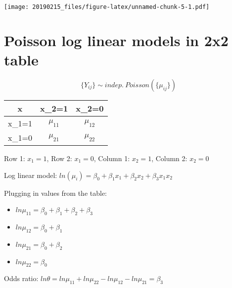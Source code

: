 \documentclass[]{article}
\providecommand{\tightlist}{%
  \setlength{\itemsep}{0pt}\setlength{\parskip}{0pt}}
\begin{document}
\texttt{[image: 20190215\_files/figure-latex/unnamed-chunk-5-1.pdf]}

\hypertarget{poisson-log-linear-models-in-2x2-table}{%
\section{Poisson log linear models in 2x2
table}\label{poisson-log-linear-models-in-2x2-table}}

\[\{Y_{ij}\} \sim indep.\ Poisson(\{\mu_{ij}\})\]

\begin{center}
 \begin{tabular}{|c | c | c |}
 \hline
 x&x_2=1&x_2=0\\ [0.5 ex]
 \hline
 x_1=1&$\mu_{11}$&$\mu_{12}$\\
 \hline
 x_1=0&$\mu_{21}$&$\mu_{22}$\\
 \hline
\end{tabular}
\end{center}

Row 1: \(x_1=1\), Row 2: \(x_1=0\), Column 1: \(x_2=1\), Column 2:
\(x_2=0\)

Log linear model:
\(ln(\mu_i) = \beta_0 + \beta_1 x_1 + \beta_2 x_2 + \beta_3 x_1x_2\)

Plugging in values from the table:

\begin{itemize}
\tightlist
\item
  \(ln\mu_{11} = \beta_0 + \beta_1 + \beta_2 + \beta_3\)
\item
  \(ln\mu_{12} = \beta_0 + \beta_1\)
\item
  \(ln\mu_{21} = \beta_0 + \beta_2\)
\item
  \(ln\mu_{22} = \beta_0\)
\end{itemize}

Odds ratio:
\(ln\theta = ln\mu_{11} + ln\mu_{22} - ln\mu_{12} - ln\mu_{21} = \beta_3\)
\end{document}
